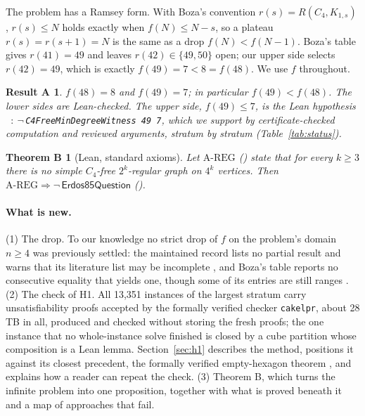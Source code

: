 \documentclass{anvil-paper}
\newcommand{\AREG}{\mathrm{A\text{-}REG}}
\newcommand{\Qn}{\textsf{Erdos85Question}}
\newcommand{\hnoFortyNine}{\lean{hno49}}
\newcommand{\cakelpr}{\texttt{cake\textunderscore lpr}}
\newtheorem*{resultA}{Result A}
\newtheorem*{theoremB}{Theorem B}
\theoremstyle{definition}
\begin{document}
The problem has a Ramsey form. With Boza's convention $r(s)=R(C_4,K_{1,s})$ \citep{boza2024ramsey,zhang2017polarity}, $r(s)\le N$ holds exactly when $f(N)\le N-s$, so a plateau $r(s)=r(s+1)=N$ is the same as a drop $f(N)<f(N-1)$. Boza's table gives $r(41)=49$ and leaves $r(42)\in\{49,50\}$ open; our upper side selects $r(42)=49$, which is exactly $f(49)=7<8=f(48)$. We use $f$ throughout.

\begin{resultA}
$f(48)=8$ and $f(49)=7$; in particular $f(49)<f(48)$. The lower sides are Lean-checked. The upper side, $f(49)\le 7$, is the Lean hypothesis \hnoFortyNine\ $:\ \neg\,$\texttt{C4FreeMinDegreeWitness 49 7}, which we support by certificate-checked computation and reviewed arguments, stratum by stratum (Table~\ref{tab:status}).
\end{resultA}

\begin{theoremB}[Lean, standard axioms]
Let $\AREG$ () state that for every $k\ge 3$ there is no simple $C_4$-free $2^k$-regular graph on $4^k$ vertices. Then $\AREG\Rightarrow\neg\,\Qn$ ().
\end{theoremB}

\paragraph{What is new.} (1) The drop. To our knowledge no strict drop of $f$ on the problem's domain $n\ge 4$ was previously settled: the maintained record lists no partial result and warns that its literature list may be incomplete \citep{bloom-erdos85}, and Boza's table reports no consecutive equality that yields one, though some of its entries are still ranges \citep{boza2024ramsey}. (2) The check of H1. All 13,351 instances of the largest stratum carry unsatisfiability proofs accepted by the formally verified checker \cakelpr{}, about 28 TB in all, produced and checked without storing the fresh proofs; the one instance that no whole-instance solve finished is closed by a cube partition whose composition is a Lean lemma. Section~\ref{sec:h1} describes the method, positions it against its closest precedent, the formally verified empty-hexagon theorem \citep{heule2024hexagon,subercaseaux2024hexagonlean}, and explains how a reader can repeat the check. (3) Theorem B, which turns the infinite problem into one proposition, together with what is proved beneath it and a map of approaches that fail.
\end{document}
